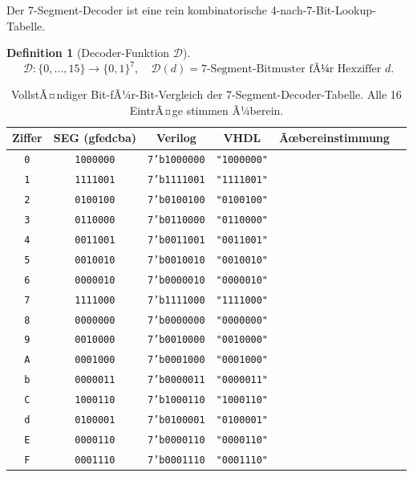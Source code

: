 ﻿\documentclass[12pt,a4paper]{report}
\newtheorem{definition}{Definition}[section]
\begin{document}
Der 7-Segment-Decoder ist eine rein kombinatorische 4-nach-7-Bit-Lookup-Tabelle.

\begin{definition}[Decoder-Funktion $\mathcal{D}$]
	\[
	\mathcal{D} : \{0,\ldots,15\} \to \{0,1\}^7, \quad
	\mathcal{D}(d) = \text{7-Segment-Bitmuster fÃ¼r Hexziffer } d.
	\]
\end{definition}

\begin{table}[H]
	\centering
	\small
	\begin{tabular}{|c|c|c|c|c|c|}
		\hline
		\textbf{Ziffer} & \textbf{SEG (gfedcba)} & \textbf{Verilog} & \textbf{VHDL} & \textbf{Ãœbereinstimmung}\\
		\hline
		\texttt{0} & \texttt{1000000} & \texttt{7'b1000000} & \texttt{"1000000"} & \checkmark \\
		\texttt{1} & \texttt{1111001} & \texttt{7'b1111001} & \texttt{"1111001"} & \checkmark \\
		\texttt{2} & \texttt{0100100} & \texttt{7'b0100100} & \texttt{"0100100"} & \checkmark \\
		\texttt{3} & \texttt{0110000} & \texttt{7'b0110000} & \texttt{"0110000"} & \checkmark \\
		\texttt{4} & \texttt{0011001} & \texttt{7'b0011001} & \texttt{"0011001"} & \checkmark \\
		\texttt{5} & \texttt{0010010} & \texttt{7'b0010010} & \texttt{"0010010"} & \checkmark \\
		\texttt{6} & \texttt{0000010} & \texttt{7'b0000010} & \texttt{"0000010"} & \checkmark \\
		\texttt{7} & \texttt{1111000} & \texttt{7'b1111000} & \texttt{"1111000"} & \checkmark \\
		\texttt{8} & \texttt{0000000} & \texttt{7'b0000000} & \texttt{"0000000"} & \checkmark \\
		\texttt{9} & \texttt{0010000} & \texttt{7'b0010000} & \texttt{"0010000"} & \checkmark \\
		\texttt{A} & \texttt{0001000} & \texttt{7'b0001000} & \texttt{"0001000"} & \checkmark \\
		\texttt{b} & \texttt{0000011} & \texttt{7'b0000011} & \texttt{"0000011"} & \checkmark \\
		\texttt{C} & \texttt{1000110} & \texttt{7'b1000110} & \texttt{"1000110"} & \checkmark \\
		\texttt{d} & \texttt{0100001} & \texttt{7'b0100001} & \texttt{"0100001"} & \checkmark \\
		\texttt{E} & \texttt{0000110} & \texttt{7'b0000110} & \texttt{"0000110"} & \checkmark \\
		\texttt{F} & \texttt{0001110} & \texttt{7'b0001110} & \texttt{"0001110"} & \checkmark \\
		\hline
	\end{tabular}
	\caption{VollstÃ¤ndiger Bit-fÃ¼r-Bit-Vergleich der 7-Segment-Decoder-Tabelle.
		Alle 16 EintrÃ¤ge stimmen Ã¼berein.}
	\label{tab:seg_decoder}
\end{table}
\end{document}
